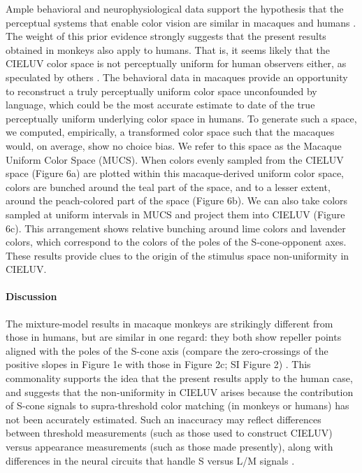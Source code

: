 \documentclass[9pt,biorxiv,lineno,onehalfspacing]{lapreprint}
\begin{document}
\begin{refsection}
Ample behavioral and neurophysiological data support the hypothesis that the perceptual systems that enable color vision are similar in macaques and humans \citep{schnapf_spectral_1987,gagin_color-detection_2014,horwitz_what_2015,lafer-sousa_color-biased_2016}. The weight of this prior evidence strongly suggests that the present results obtained in monkeys also apply to humans. That is, it seems likely that the CIELUV color space is not perceptually uniform for human observers either, as speculated by others \citep{stockman_colorimetry_2010,judd_ideal_1970}. The behavioral data in macaques provide an opportunity to reconstruct a truly perceptually uniform color space unconfounded by language, which could be the most accurate estimate to date of the true perceptually uniform underlying color space in humans. To generate such a space, we computed, empirically, a transformed color space such that the macaques would, on average, show no choice bias. We refer to this space as the Macaque Uniform Color Space (MUCS). When colors evenly sampled from the CIELUV space (Figure 6a) are plotted within this macaque-derived uniform color space, colors are bunched around the teal part of the space, and to a lesser extent, around the peach-colored part of the space (Figure 6b). We can also take colors sampled at uniform intervals in MUCS and project them into CIELUV (Figure 6c). This arrangement shows relative bunching around lime colors and lavender colors, which correspond to the colors of the poles of the S-cone-opponent axes. These results provide clues to the origin of the stimulus space non-uniformity in CIELUV.

\paragraph{Discussion}

The mixture-model results in macaque monkeys are strikingly different from those in humans, but are similar in one regard: they both show repeller points aligned with the poles of the S-cone axis (compare the zero-crossings of the positive slopes in Figure 1e with those in Figure 2c; SI Figure 2) \citep{skelton_biological_2017,bae_why_2015,panichello_error-correcting_2019}. This commonality supports the idea that the present results apply to the human case, and suggests that the non-uniformity in CIELUV arises because the contribution of S-cone signals to supra-threshold color matching (in monkeys or humans) has not been accurately estimated. Such an inaccuracy may reflect differences between threshold measurements (such as those used to construct CIELUV) versus appearance measurements (such as those made presently), along with differences in the neural circuits that handle S versus L/M signals \citep{RN655, conway_color_2014}. 


\end{refsection}
\end{document}
